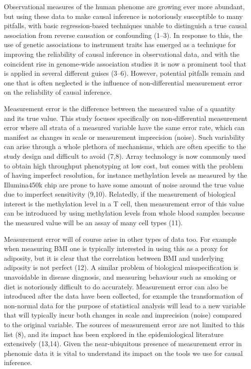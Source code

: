 \documentclass[]{article}
\begin{document}
Observational measures of the human phenome are growing ever more
abundant, but using these data to make causal inference is notoriously
susceptible to many pitfalls, with basic regression-based techniques
unable to distinguish a true causal association from reverse causation
or confounding (1--3). In response to this, the use of genetic
associations to instrument traits has emerged as a technique for
improving the reliability of causal inference in observational data, and
with the coincident rise in genome-wide association studies it is now a
prominent tool that is applied in several different guises (3--6).
However, potential pitfalls remain and one that is often neglected is
the influence of non-differential measurement error on the reliability
of causal inference.

Measurement error is the difference between the measured value of a
quantity and its true value. This study focuses specifically on
non-differential measurement error where all strata of a measured
variable have the same error rate, which can manifest as changes in
scale or measurement imprecision (noise). Such variability can arise
through a whole plethora of mechanisms, which are often specific to the
study design and difficult to avoid (7,8). Array technology is now
commonly used to obtain high throughput phenotyping at low cost, but
comes with the problem of having imperfect resolution, for instance
methylation levels as measured by the Illumina450k chip are prone to
have some amount of noise around the true value due to imperfect
sensitivity (9,10). Relatedly, if the measurement of biological interest
is the methylation level in a T cell, then measurement error of this
value can be introduced by using methylation levels from whole blood
samples because the measured value will be an assay of many cell types
(11).

Measurement error will of course arise in other types of data too. For
example when measuring BMI one is typically interested in using this as
a proxy for adiposity, but it is clear that the correlation between BMI
and underlying adiposity is not perfect (12). A similar problem of
biological misspecification is unavoidable in disease diagnosis, and
measuring behaviour such as smoking or diet is notoriously difficult to
do accurately. Measurement error can also be introduced after the data
have been collected, for example the transformation of non-normal data
for the purpose of statistical analysis will lead to a new variable that
will typically incur both changes in scale and imprecision (noise)
compared to the original variable. The sources of measurement error are
not limited to this list (8), and its impact has been explored in the
epidemiological literature extensively (13,14). Given the
near-ubiquitous presence of measurement error in phenomic data it is
vital to understand its impact on the tools we use for causal inference.
\end{document}
